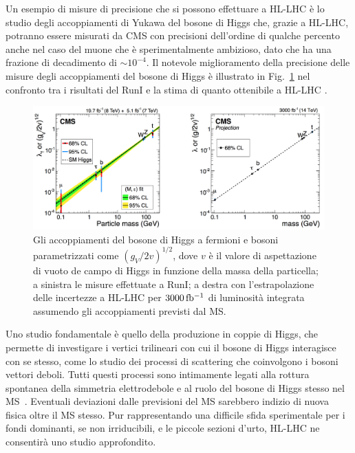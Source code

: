 Un esempio di misure di precisione che si possono effettuare a HL-LHC è lo studio degli accoppiamenti di Yukawa del bosone di Higgs che, grazie a HL-LHC, potranno essere misurati da CMS con precisioni dell'ordine di qualche percento anche nel caso del muone che \`e sperimentalmente ambizioso, dato che ha una frazione di decadimento di $\sim 10^{-4}$.
Il notevole miglioramento della precisione delle misure degli accoppiamenti del bosone di Higgs \`e illustrato in Fig.~\ref{HLLHCCouplings} nel confronto tra i risultati del RunI e la stima di quanto ottenibile a HL-LHC \cite{CMSCollaboration:2015zni,Khachatryan:2014jba}.
\begin{figure}
\centering
\includegraphics[width=\textwidth]{Immagini/HLLHC_Couplings.png}
\caption{Gli accoppiamenti del bosone di Higgs a fermioni e bosoni parametrizzati come $(g_V/2v)^{1/2}$, dove $v$ \`e il valore di aspettazione di vuoto de campo di Higgs in funzione della massa della particella; a sinistra le misure effettuate a RunI; a destra con l'estrapolazione delle incertezze a HL-LHC per $3000{\rm \, fb^{-1}}$ di luminosit\`a integrata assumendo gli accoppiamenti previsti dal MS.}
\label{HLLHCCouplings}
\end{figure}

Uno studio fondamentale \`e quello della produzione in coppie di Higgs, che permette di investigare i vertici trilineari con cui il bosone di Higgs interagisce con se stesso, come lo studio dei processi di scattering che coinvolgono i bosoni vettori deboli. Tutti questi processi sono intimamente legati alla rottura spontanea della simmetria elettrodebole e al ruolo del bosone di Higgs stesso nel MS~\cite{CMSCollaboration:2015zni}. Eventuali deviazioni dalle previsioni del MS sarebbero indizio di nuova fisica oltre il MS stesso. Pur rappresentando una difficile sfida sperimentale per i fondi dominanti, se non irriducibili, e le piccole sezioni d'urto, HL-LHC ne consentir\`a uno studio approfondito.

